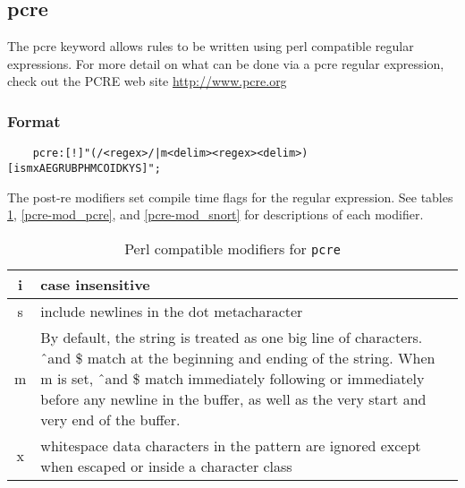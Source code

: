 \documentclass[english]{report}
\begin{document}
\subsection{pcre}
\label{pcre}

The pcre keyword allows rules to be written using perl compatible regular
expressions.   For more detail on what can be done via a pcre regular
expression, check out the PCRE web site \url{http://www.pcre.org}

\subsubsection{Format}

\begin{verbatim}
    pcre:[!]"(/<regex>/|m<delim><regex><delim>)[ismxAEGRUBPHMCOIDKYS]";
\end{verbatim}

The post-re modifiers set compile time flags for the regular expression.  See
tables \ref{pcre-mod_perl}, \ref{pcre-mod_pcre}, and \ref{pcre-mod_snort} for
descriptions of each modifier.

\begin{table}[ht]
\begin{center}
\caption{Perl compatible modifiers for \texttt{pcre}}
\label{pcre-mod_perl}
\begin{tabular}{|c|p{4.5in}|}

\hline
i & case insensitive \\

\hline
s & include newlines in the dot metacharacter \\

\hline
m &

By default, the string is treated as one big line of characters.  \^\ and \$
match at the beginning and ending of the string. When m is set, \^\ and \$
match immediately following or immediately before any newline in the buffer, as
well as the very start and very end of the buffer. \\

\hline
x &

whitespace  data characters in the pattern are ignored except when escaped or
inside a character class \\

\hline
\end{tabular}
\end{center}
\end{table}
\end{document}
